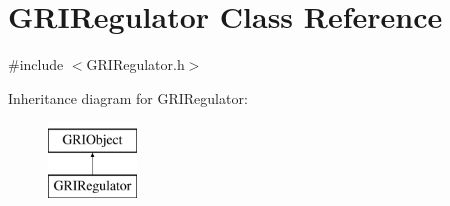 \hypertarget{classGRIRegulator}{\section{\-G\-R\-I\-Regulator \-Class \-Reference}
\label{classGRIRegulator}
}


{\ttfamily \#include $<$\-G\-R\-I\-Regulator.\-h$>$}

\-Inheritance diagram for \-G\-R\-I\-Regulator\-:\begin{figure}[H]
\begin{center}
\leavevmode
\includegraphics[height=2.000000cm]{classGRIRegulator}
\end{center}
\end{figure}
